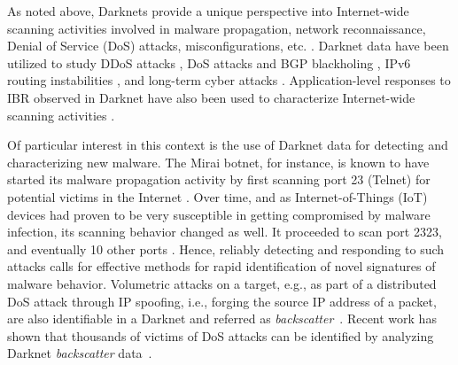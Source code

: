 \documentclass[manuscript, nonacm]{acmart}
\newcommand{\todovh}[1]{\todo[author=Vasant Honavar, inline, color=yellow]{#1}}
\newcommand{\todojohn}[1]{\todo[author=John Yen, inline, color=iora]{#1}}
\begin{document}
As noted above,  Darknets provide a unique perspective
into Internet-wide scanning activities involved in malware propagation,  network reconnaissance, Denial of Service (DoS) attacks, misconfigurations, etc.
\cite{%
Durumeric:2014:IVI:2671225.2671230,jonker2017millions,Dainotti2014botnetIBR,Wustrow2010IBRrevisted,Herwig2019HajimeIRB,ScannersDarknet2019}. 
Darknet data have been utilized
to study DDoS attacks \cite{Czyz2014NTPDDoS,Fachkha2015DDoS,chiang2000fault,Wang2018DDoS},
DoS attacks and BGP blackholing \cite{Jonker2018DoS_BGP_IBR},
IPv6 routing instabilities \cite{Czyz2013IPv6IBR},
and long-term cyber attacks \cite{Ban2012LongTermAttack}. 
Application-level responses to IBR observed in Darknet
have also been used to characterize Internet-wide 
scanning activities
\cite{Pang2004IBR_active_responses}.


Of particular interest in this context is the use of Darknet data for 
detecting and characterizing new malware.
The Mirai botnet, for instance, is known to have started its malware propagation activity
by first scanning port 23 (Telnet) for potential victims in
the Internet \cite{MiraiUSENIX2017}.  Over time, 
and as  Internet-of-Things (IoT) devices had proven
to be very susceptible in getting 
compromised by malware infection, its scanning behavior changed as well.  
It proceeded to  scan
port 2323, and eventually
10 other ports \cite{MiraiUSENIX2017}. 
Hence, reliably detecting and responding to such attacks calls for effective methods 
for rapid identification of novel signatures of  malware behavior. 
Volumetric attacks on a target, e.g., as part of a distributed DoS attack through IP 
spoofing, i.e., forging the source IP address of a packet, 
are also identifiable in a Darknet and referred as \emph{backscatter}~\cite{moore01inferring}.
Recent work has shown that thousands of victims of DoS attacks can be identified by analyzing Darknet \emph{backscatter} data~\cite{jonker2017millions,Iglesias2017IBRpatterns}. 
\end{document}

